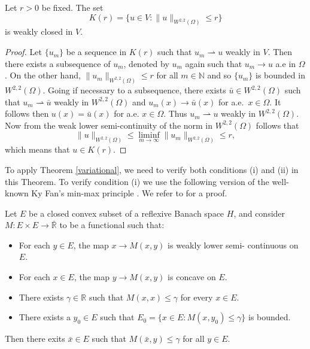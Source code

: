 \documentclass[reqno]{amsart}
\begin{document}
\begin{lemma}\label{Kclosed}
Let \(r > 0\) be fixed. The set
\[
K(r)=\{u\in V: \rVert u \rVert_{ W^{2,2}(\Omega)}\leq r\}
\]
is weakly closed in \(V\).
\end{lemma}

\begin{proof}
Let \(\{u_m\}\) be a sequence in \(K(r)\) such that \(u_m\rightharpoonup u\) weakly
in \(V\).
Then there exists a subsequence of \(u_m\), denoted by \(u_m\) again such that
\(u_m\to u\) a.e in \(\Omega\).
On the other hand,  \(\rVert u_m \rVert_{ W^{2,2}(\Omega)}\leq r\) for all
\(m \in \mathbb{N}\) and so  \(\{u_m\}\)
is bounded in \(W^{2,2}(\Omega)\). Going if necessary to a subsequence, there exists
\(\bar{u}  \in W^{2,2}(\Omega)\)  such that \(u_m \rightharpoonup \bar{u}\) weakly in
\(W^{2,2}(\Omega)\) and \(u_m(x) \to\bar{u}(x) \) for a.e.\
 \(x \in \Omega\). It follows then \(u(x)=\bar{u}(x) \) for a.e. \(x \in \Omega\).
Thus \(u_m \rightharpoonup u\) weakly in \(W^{2,2}(\Omega)\). Now from the
weak lower semi-continuity of the norm in \(W^{2,2}(\Omega)\)  follows that
\[
\rVert u \rVert_{ W^{2,2}(\Omega)}
\leq \liminf_{m\to\infty} \rVert u_m \rVert_{ W^{2,2}(\Omega)}\leq r ,
\]
which means that \(u\in K(r)\).
\end{proof}

To apply Theorem \ref{variational}, we need to verify both conditions (i)
and (ii) in this Theorem. To verify
condition (i) we  use the following version of the well-known Ky Fan's
min-max principle \cite{HB}. We refer to \cite[Lemma 12.1]{NG} for a proof.

\begin{lemma}\label{Ky Fan 2}
Let \(E\) be a closed convex subset of a reflexive Banach space \(H\), and consider
\(M : E \times E \to\bar{\mathbb{R}}\)
to be a functional such that:
\begin{itemize}
    \item[(1)] For each \(y\in E\), the map \(x \to M(x, y)\) is weakly lower semi-
     continuous on \(E\).
    \item[(2)] For each \(x \in E\), the map \(y \to M(x, y)\) is concave on \(E\).
    \item[(3)] There exists \( \gamma\in \mathbb{R}\) such that \(M(x, x) \leq \gamma\)
    for every  \(x \in E\).
    \item[(4)] There exists a \(y_0 \in E\) such that
     \(E_0 = \{x \in E : M(x, y_0) \leq \gamma\} \) is bounded.
\end{itemize}
Then there exits \(\bar{x} \in E\) such that \(M(\bar{x}, y) \leq \gamma\) for all
\(y \in E\).
\end{lemma}
\end{document}
